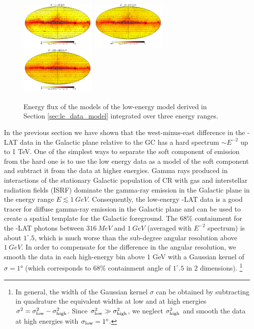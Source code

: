 \begin{figure}[t]
\includegraphics[width=0.33\textwidth]{plots/Mollweide_LowE_model_03-10GeV_flux_source_range_0_log.pdf}
\includegraphics[width=0.33\textwidth]{plots/Mollweide_LowE_model_03-10GeV_flux_source_range_1_log.pdf}
\includegraphics[width=0.33\textwidth]{plots/Mollweide_LowE_model_03-10GeV_flux_source_range_2_log.pdf}
\caption{Energy flux of the models of the low-energy model derived in Section \ref{sec:le_data_model}
integrated over three energy ranges. }
\label{fig:Maps_lowE_model}
\end{figure}

In the previous section we have shown that the west-minus-east difference in the \Fermi-LAT data in the Galactic plane relative to the GC has a hard 
spectrum $\sim E^{-2}$ up to 1 TeV.
One of the simplest ways to separate the soft component of emission from the hard one is to use the low energy data as
a model of the soft component and subtract it from the data at higher energies.
Gamma rays produced in interactions of the stationary Galactic population of CR with gas and interstellar radiation fields (ISRF)
dominate the gamma-ray emission in the Galactic plane in the energy range $E \lesssim \SI{1}{GeV}$. 
Consequently, the low-energy \Fermi-LAT data is a good tracer for diffuse gamma-ray emission in the Galactic plane and can be used to create a spatial template for the Galactic foreground.
The 68\% containment for the \Fermi-LAT photons between $\SI{316}{MeV}$ and $\SI{1}{GeV}$ (averaged with $E^{-2}$ spectrum) is about $1^\circ\!\!.5$,
which is much worse than the sub-degree angular resolution above $\SI{1}{GeV}$.
In order to compensate for the difference in the angular resolution, 
we smooth the data in each high-energy bin above 1 GeV
with a Gaussian kernel of $\sigma = \ang{1}$ (which corresponds to $68\%$ containment angle of
$1^\circ\!\!.5$ in 2 dimensions).%
\footnote{In general, the width of the Gaussian kernel $\sigma$ can be obtained by subtracting in quadrature
the equivalent widths at low and at high energies $\sigma^2 = \sigma_{\rm low}^2 - \sigma_{\rm high}^2$.
Since $\sigma_{\rm low}^2 \gg \sigma_{\rm high}^2$, we neglect $\sigma_{\rm high}^2$ and smooth the 
data at high energies with $\sigma_{\rm low} = 1^\circ$.}

